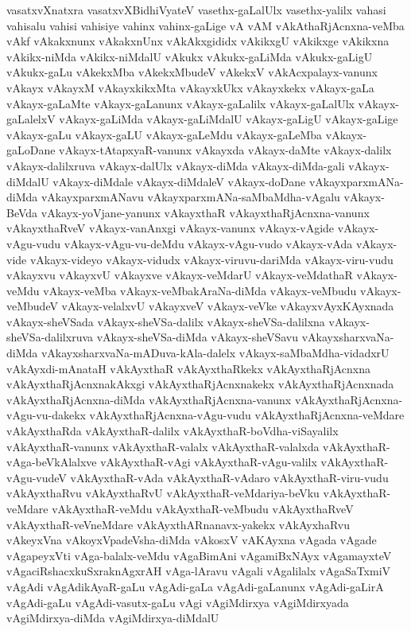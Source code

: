 {vasatxvXnatxra
vasatxvXBidhiVyateV
vasethx-gaLalUlx
vasethx-yalilx
vahasi
vahisalu
vahisi
vahisiye
vahinx
vahinx-gaLige
vA
vAM
vAkAthaRjAcnxna-veMba
vAkf
vAkakxnunx
vAkakxnUnx
vAkAkxgididx
vAkikxgU
vAkikxge
vAkikxna
vAkikx-niMda
vAkikx-niMdalU
vAkukx
vAkukx-gaLiMda
vAkukx-gaLigU
vAkukx-gaLu
vAkekxMba
vAkekxMbudeV
vAkekxV
vAkAcxpalayx-vanunx
vAkayx
vAkayxM
vAkayxkikxMta
vAkayxkUkx
vAkayxkekx
vAkayx-gaLa
vAkayx-gaLaMte
vAkayx-gaLanunx
vAkayx-gaLalilx
vAkayx-gaLalUlx
vAkayx-gaLalelxV
vAkayx-gaLiMda
vAkayx-gaLiMdalU
vAkayx-gaLigU
vAkayx-gaLige
vAkayx-gaLu
vAkayx-gaLU
vAkayx-gaLeMdu
vAkayx-gaLeMba
vAkayx-gaLoDane
vAkayx-tAtapxyaR-vanunx
vAkayxda
vAkayx-daMte
vAkayx-dalilx
vAkayx-dalilxruva
vAkayx-dalUlx
vAkayx-diMda
vAkayx-diMda-gali
vAkayx-diMdalU
vAkayx-diMdale
vAkayx-diMdaleV
vAkayx-doDane
vAkayxparxmANa-diMda
vAkayxparxmANavu
vAkayxparxmANa-saMbaMdha-vAgalu
vAkayx-BeVda
vAkayx-yoVjane-yanunx
vAkayxthaR
vAkayxthaRjAcnxna-vanunx
vAkayxthaRveV
vAkayx-vanAnxgi
vAkayx-vanunx
vAkayx-vAgide
vAkayx-vAgu-vudu
vAkayx-vAgu-vu-deMdu
vAkayx-vAgu-vudo
vAkayx-vAda
vAkayx-vide
vAkayx-videyo
vAkayx-vidudx
vAkayx-viruvu-dariMda
vAkayx-viru-vudu
vAkayxvu
vAkayxvU
vAkayxve
vAkayx-veMdarU
vAkayx-veMdathaR
vAkayx-veMdu
vAkayx-veMba
vAkayx-veMbakAraNa-diMda
vAkayx-veMbudu
vAkayx-veMbudeV
vAkayx-velalxvU
vAkayxveV
vAkayx-veVke
vAkayxvAyxKAyxnada
vAkayx-sheVSada
vAkayx-sheVSa-dalilx
vAkayx-sheVSa-dalilxna
vAkayx-sheVSa-dalilxruva
vAkayx-sheVSa-diMda
vAkayx-sheVSavu
vAkayxsharxvaNa-diMda
vAkayxsharxvaNa-mADuva-kAla-dalelx
vAkayx-saMbaMdha-vidadxrU
vAkAyxdi-mAnataH
vAkAyxthaR
vAkAyxthaRkekx
vAkAyxthaRjAcnxna
vAkAyxthaRjAcnxnakAkxgi
vAkAyxthaRjAcnxnakekx
vAkAyxthaRjAcnxnada
vAkAyxthaRjAcnxna-diMda
vAkAyxthaRjAcnxna-vanunx
vAkAyxthaRjAcnxna-vAgu-vu-dakekx
vAkAyxthaRjAcnxna-vAgu-vudu
vAkAyxthaRjAcnxna-veMdare
vAkAyxthaRda
vAkAyxthaR-dalilx
vAkAyxthaR-boVdha-viSayalilx
vAkAyxthaR-vanunx
vAkAyxthaR-valalx
vAkAyxthaR-valalxda
vAkAyxthaR-vAga-beVkAlalxve
vAkAyxthaR-vAgi
vAkAyxthaR-vAgu-valilx
vAkAyxthaR-vAgu-vudeV
vAkAyxthaR-vAda
vAkAyxthaR-vAdaro
vAkAyxthaR-viru-vudu
vAkAyxthaRvu
vAkAyxthaRvU
vAkAyxthaR-veMdariya-beVku
vAkAyxthaR-veMdare
vAkAyxthaR-veMdu
vAkAyxthaR-veMbudu
vAkAyxthaRveV
vAkAyxthaR-veVneMdare
vAkAyxthARnanavx-yakekx
vAkAyxhaRvu
vAkeyxVna
vAkoyxVpadeVsha-diMda
vAkosxV
vAKAyxna
vAgada
vAgade
vAgapeyxVti
vAga-balalx-veMdu
vAgaBimAni
vAgamiBxNAyx
vAgamayxteV
vAgaciRshacxkuSxraknAgxrAH
vAga-lAravu
vAgali
vAgalilalx
vAgaSaTxmiV
vAgAdi
vAgAdikAyaR-gaLu
vAgAdi-gaLa
vAgAdi-gaLanunx
vAgAdi-gaLirA
vAgAdi-gaLu
vAgAdi-vasutx-gaLu
vAgi
vAgiMdirxya
vAgiMdirxyada
vAgiMdirxya-diMda
vAgiMdirxya-diMdalU
}
